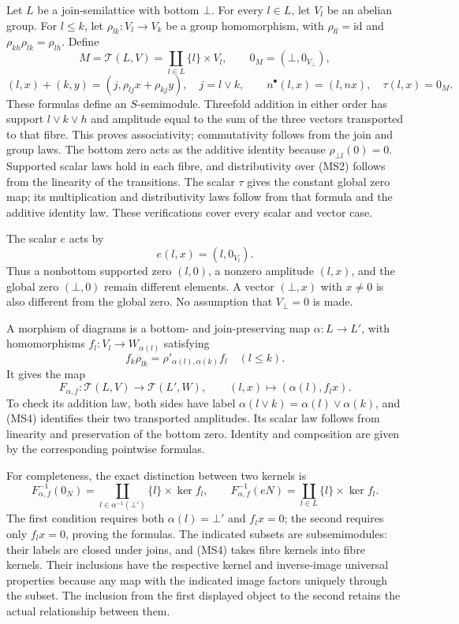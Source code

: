 \documentclass[
]{article}
\begin{document}
Let \(L\) be a join-semilattice with bottom \(\bot\). For every
\(l\in L\), let \(V_l\) be an abelian group. For \(l\le k\), let
\(\rho_{lk}:V_l\to V_k\) be a group homomorphism, with
\(\rho_{ll}=\mathrm{id}\) and \(\rho_{kh}\rho_{lk}=\rho_{lh}\). Define
\[
M=\mathcal T(L,V)=\coprod_{l\in L}\{l\}\times V_l,
\qquad 0_M=(\bot,0_{V_\bot}),
\tag{MS1}
\] \[
(l,x)+(k,y)=(j,\rho_{lj}x+\rho_{kj}y),\quad j=l\vee k,
\qquad n^\bullet(l,x)=(l,nx),\quad \tau(l,x)=0_M.
\tag{MS2}
\] These formulas define an \(S\)-semimodule. Threefold addition in
either order has support \(l\vee k\vee h\) and amplitude equal to the
sum of the three vectors transported to that fibre. This proves
associativity; commutativity follows from the join and group laws. The
bottom zero acts as the additive identity because
\(\rho_{\bot l}(0)=0\). Supported scalar laws hold in each fibre, and
distributivity over (MS2) follows from the linearity of the transitions.
The scalar \(\tau\) gives the constant global zero map; its
multiplication and distributivity laws follow from that formula and the
additive identity law. These verifications cover every scalar and vector
case.

The scalar \(e\) acts by \[
e(l,x)=(l,0_{V_l}).
\tag{MS3}
\] Thus a nonbottom supported zero \((l,0)\), a nonzero amplitude
\((l,x)\), and the global zero \((\bot,0)\) remain different elements. A
vector \((\bot,x)\) with \(x\ne0\) is also different from the global
zero. No assumption that \(V_\bot=0\) is made.

A morphism of diagrams is a bottom- and join-preserving map
\(\alpha:L\to L'\), with homomorphisms \(f_l:V_l\to W_{\alpha(l)}\)
satisfying \[
f_k\rho_{lk}=\rho'_{\alpha(l),\alpha(k)}f_l\quad(l\le k).
\tag{MS4}
\] It gives the map \[
F_{\alpha,f}:\mathcal T(L,V)\longrightarrow\mathcal T(L',W),
\qquad (l,x)\longmapsto(\alpha(l),f_lx).
\tag{MS5}
\] To check its addition law, both sides have label
\(\alpha(l\vee k)=\alpha(l)\vee\alpha(k)\), and (MS4) identifies their
two transported amplitudes. Its scalar law follows from linearity and
preservation of the bottom zero. Identity and composition are given by
the corresponding pointwise formulas.

For completeness, the exact distinction between two kernels is \[
F_{\alpha,f}^{-1}(0_N)
=\coprod_{l\in\alpha^{-1}(\bot')}\{l\}\times\ker f_l,
\qquad
F_{\alpha,f}^{-1}(eN)
=\coprod_{l\in L}\{l\}\times\ker f_l.
\tag{MS6}
\] The first condition requires both \(\alpha(l)=\bot'\) and \(f_lx=0\);
the second requires only \(f_lx=0\), proving the formulas. The indicated
subsets are subsemimodules: their labels are closed under joins, and
(MS4) takes fibre kernels into fibre kernels. Their inclusions have the
respective kernel and inverse-image universal properties because any map
with the indicated image factors uniquely through the subset. The
inclusion from the first displayed object to the second retains the
actual relationship between them.
\end{document}
